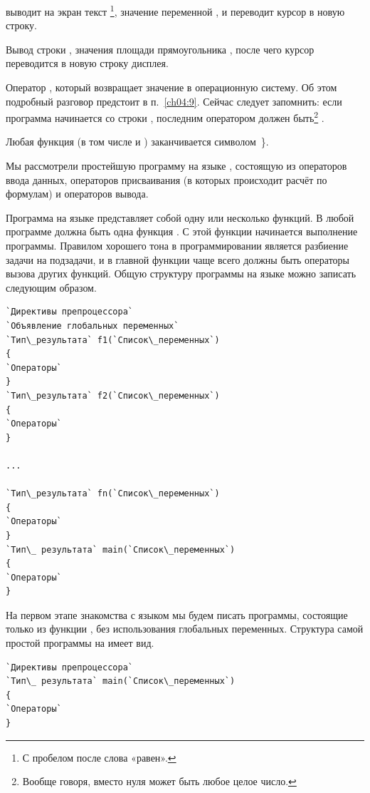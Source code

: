 выводит на экран текст \footnote{С пробелом после слова
«равен».}, значение переменной , и переводит курсор в новую строку.

 Вывод строки , значения площади
прямоугольника , после чего курсор переводится в новую строку дисплея.

 Оператор , который возвращает значение в
операционную систему. Об этом подробный разговор предстоит в п.~\ref{ch04:9}. %
Сейчас следует запомнить: если программа
начинается со строки , последним оператором должен быть\footnote{Вообще говоря, вместо нуля может быть любое целое число.}
.

 Любая функция (в том числе и ) заканчивается символом~\}.

Мы рассмотрели простейшую программу на языке , состоящую из операторов ввода 
данных, операторов присваивания (в
которых происходит расчёт по формулам) и операторов вывода. 

Программа на языке  представляет собой одну или несколько функций. 
В любой программе 
должна быть одна функция . С этой функции начинается 
выполнение программы. Правилом хорошего
тона в программировании является разбиение задачи на подзадачи, и в главной функции 
чаще всего должны быть операторы
вызова других функций. Общую структуру программы на 
языке  можно записать следующим
образом. 

\begin{lstlisting}
`Директивы препроцессора`
`Объявление глобальных переменных`
`Тип\_результата` f1(`Список\_переменных`)
{
`Операторы`
}
`Тип\_результата` f2(`Список\_переменных`)
{
`Операторы`
}

...

`Тип\_результата` fn(`Список\_переменных`)
{
`Операторы`
}
`Тип\_ результата` main(`Список\_переменных`)
{
`Операторы`
}
\end{lstlisting}

На первом этапе знакомства с языком мы будем писать программы, состоящие только из функции , без использования
глобальных переменных. Структура самой  простой программы на  имеет вид.
\begin{lstlisting}
`Директивы препроцессора`
`Тип\_ результата` main(`Список\_переменных`)
{
`Операторы`
}
\end{lstlisting}

